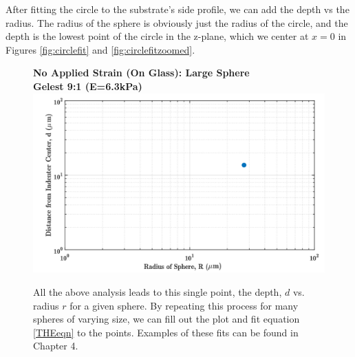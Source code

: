 After fitting the circle to the substrate's side profile, we can add the depth vs the radius. The radius of the sphere is obviously just the radius of the circle, and the depth is the lowest point of the circle in the z-plane, which we center at $ x=0 $ in Figures \ref{fig:circlefit} and \ref{fig:circlefitzoomed}.  

\begin{figure}
	\centering
	{\large \textbf{No Applied Strain (On Glass): Large Sphere}}\\
	{\large \textbf{Gelest 9:1 (E=6.3kPa)}}
	\includegraphics[width=\linewidth]{Chapters/Figures/sphere011_ia/single_d_vs_r}
	\caption[D vs R plot]{All the above analysis leads to this single point, the depth, $ d $ vs. radius $ r $ for a given sphere. By repeating this process for many spheres of varying size, we can fill out the plot and fit equation \ref{THEeqn} to the points. Examples of these fits can be found in Chapter 4.}
	\label{fig:singledvsr}
\end{figure}
